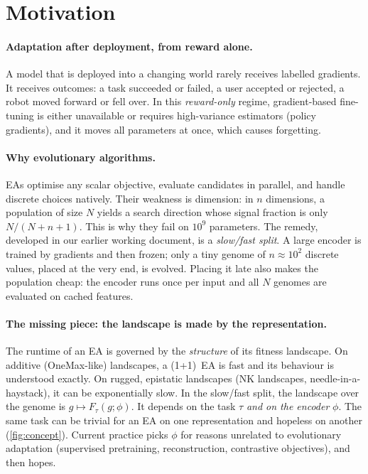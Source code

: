 \documentclass[11pt,a4paper]{article}
\theoremstyle{definition}
\theoremstyle{plain}
\theoremstyle{remark}
\begin{document}
\tableofcontents
\newpage

\section{Motivation}
\label{sec:motivation}

\paragraph{Adaptation after deployment, from reward alone.}
A model that is deployed into a changing world rarely receives labelled gradients. It receives outcomes: a task succeeded or failed, a user accepted or rejected, a robot moved forward or fell over. In this \emph{reward-only} regime, gradient-based fine-tuning is either unavailable or requires high-variance estimators (policy gradients), and it moves all parameters at once, which causes forgetting.

\paragraph{Why evolutionary algorithms.}
EAs optimise any scalar objective, evaluate candidates in parallel, and handle discrete choices natively. Their weakness is dimension: in $n$ dimensions, a population of size $N$ yields a search direction whose signal fraction is only $N/(N+n+1)$. This is why they fail on $10^9$ parameters. The remedy, developed in our earlier working document, is a \emph{slow/fast split}. A large encoder is trained by gradients and then frozen; only a tiny genome of $n\approx 10^2$ discrete values, placed at the very end, is evolved. Placing it late also makes the population cheap: the encoder runs once per input and all $N$ genomes are evaluated on cached features.

\paragraph{The missing piece: the landscape is made by the representation.}
The runtime of an EA is governed by the \emph{structure} of its fitness landscape. On additive (OneMax-like) landscapes, a (1+1)~EA is fast and its behaviour is understood exactly. On rugged, epistatic landscapes (NK landscapes, needle-in-a-haystack), it can be exponentially slow.
In the slow/fast split, the landscape over the genome is $g \mapsto F_\tau(g;\phi)$. It depends on the task $\tau$ \emph{and on the encoder} $\phi$. The same task can be trivial for an EA on one representation and hopeless on another (\cref{fig:concept}).
Current practice picks $\phi$ for reasons unrelated to evolutionary adaptation (supervised pretraining, reconstruction, contrastive objectives), and then hopes.
\end{document}
